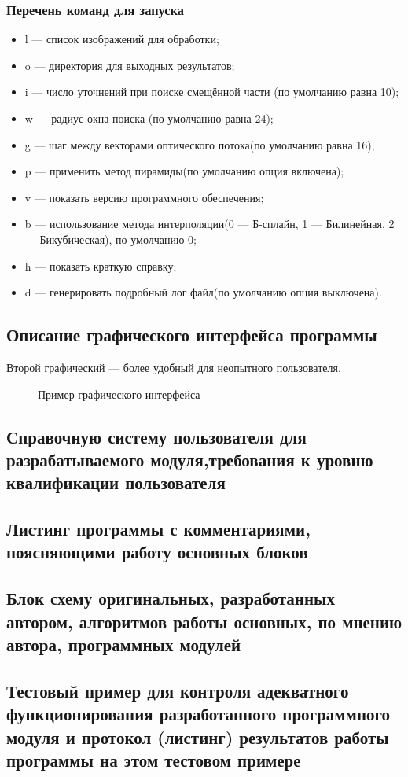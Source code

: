 \subsubsection{Перечень команд для запуска}
\begin{itemize}
\item l — список изображений для обработки;
\item o — директория для выходных результатов;
\item i — число уточнений при поиске смещённой части (по умолчанию равна 10);
\item w — радиус окна поиска (по умолчанию равна 24);
\item g — шаг между векторами оптического потока(по умолчанию равна 16);
\item p — применить метод пирамиды(по умолчанию опция включена);
\item v — показать версию программного обеспечения;
\item b — использование метода интерполяции(0 — Б-сплайн, 1 — Билинейная, 2 — Бикубическая), по умолчанию 0;
\item h — показать краткую справку;
\item d — генерировать подробный лог файл(по умолчанию опция выключена).
\end{itemize}
\subsection{Описание графического интерфейса программы}
Второй графический — более удобный для неопытного пользователя. 

\begin{figure}[ht]
\caption{Пример графического интерфейса}
\label{pic:gui_scr}
\end{figure}

\subsection{Справочную систему пользователя для разрабатываемого модуля,требования к уровню квалификации пользователя}
\subsection{Листинг программы с комментариями, поясняющими работу основных блоков}
\subsection{Блок схему оригинальных, разработанных автором, алгоритмов работы основных, по мнению автора, программных модулей}
\subsection{Тестовый пример для контроля адекватного функционирования разработанного программного модуля и протокол (листинг) результатов работы программы на этом тестовом примере}